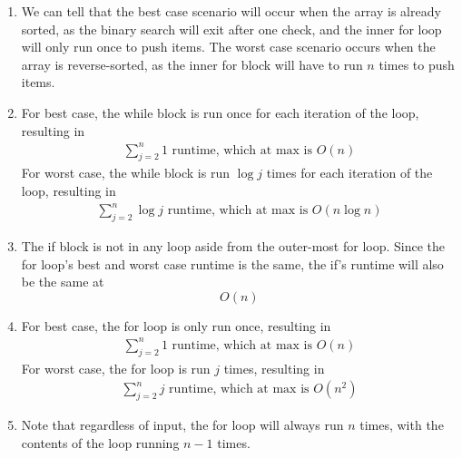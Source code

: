 \documentclass{article}
\begin{document}
\begin{enumerate}
    \item We can tell that the best case scenario will occur when the array is already sorted, as the binary search will exit after one check, and the inner for loop will only run once to push items.
          The worst case scenario occurs when the array is reverse-sorted, as the inner for block will have to run $n$ times to push items.
    \item For best case, the while block is run once for each iteration of the loop, resulting in
          \begin{align*}
              \sum_{j=2}^{n}{1} \text{ runtime, which at max is } O(n)
          \end{align*}
          For worst case, the while block is run \(\log j\) times for each iteration of the loop, resulting in
          \begin{align*}
              \sum_{j=2}^{n}{\log j} \text{ runtime, which at max is } O(n \log n)
          \end{align*}
    \item The if block is not in any loop aside from the outer-most for loop. Since the for loop's best and worst case runtime is the same, the if's runtime will also be the same at
          \[O(n)\]
    \item For best case, the for loop is only run once, resulting in
          \begin{align*}
              \sum_{j=2}^{n}{1} \text{ runtime, which at max is } O(n)
          \end{align*}
          For worst case, the for loop is run \(j\) times, resulting in
          \begin{align*}
              \sum_{j=2}^{n}{j} \text{ runtime, which at max is } O(n^2)
          \end{align*}
    \item
          Note that regardless of input, the for loop will always run $n$ times, with the contents of the loop running $n - 1$ times. \\


\end{enumerate}
\end{document}
